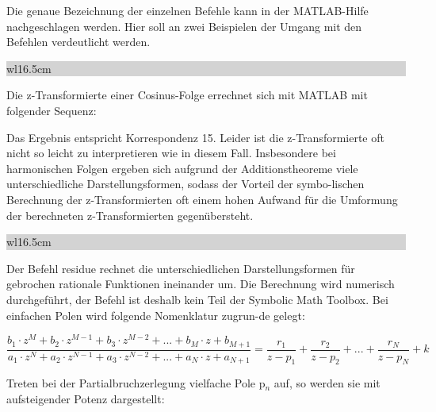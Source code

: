 \noindent Die genaue Bezeichnung der einzelnen Befehle kann in der MATLAB-Hilfe nachgeschlagen werden. Hier soll an zwei Beispielen der Umgang mit den Befehlen verdeutlicht werden. \bigskip

\noindent
\colorbox{lightgray}{%
%
\renewcommand\arraystretch{0.6}%
\begin{tabular}{ wl{16.5cm} }
{\selectfont{Beispiel: z-Transformation einer harmonischen Folge mit MATLAB}}
\end{tabular}%
}\medskip

\noindent Die z-Transformierte einer Cosinus-Folge errechnet sich mit MATLAB mit folgender Sequenz:



\noindent Das Ergebnis entspricht Korrespondenz 15. Leider ist die z-Transformierte oft nicht so leicht zu interpretieren wie in diesem Fall. Insbesondere bei harmonischen Folgen ergeben sich aufgrund der Additionstheoreme viele unterschiedliche Darstellungsformen, sodass der Vorteil der symbo-lischen Berechnung der z-Transformierten oft einem hohen Aufwand für die Umformung der berechneten 
z-Transformierten gegenübersteht.

\clearpage

\noindent
\colorbox{lightgray}{%
%
\renewcommand\arraystretch{0.6}%
\begin{tabular}{ wl{16.5cm} }
{\selectfont{Beispiel: Partialbruchzerlegung mit MATLAB}}
\end{tabular}%
}\medskip

\noindent Der Befehl residue rechnet die unterschiedlichen Darstellungsformen für gebrochen rationale Funktionen ineinander um. Die Berechnung wird numerisch durchgeführt, der Befehl ist deshalb kein Teil der Symbolic Math Toolbox. Bei einfachen Polen wird folgende Nomenklatur zugrun-de gelegt:

\begin{equation}\label{eq:fiveonehundredtwentyseven}
\frac{b_{1} \cdot z^{M} +b_{2} \cdot z^{M-1} +b_{3} \cdot z^{M-2} +...+b_{M} \cdot z+b_{M+1} }{a_{1} \cdot z^{N} +a_{2} \cdot z^{N-1} +a_{3} \cdot z^{N-2} +...+a_{N} \cdot z+a_{N+1} } =\frac{r_{1} }{z-p_{1} } +\frac{r_{2} }{z-p_{2} } +...+\frac{r_{N} }{z-p_{N} } +k
\end{equation}

\noindent Treten bei der Partialbruchzerlegung vielfache Pole p${}_{n}$ auf, so werden sie mit aufsteigender Potenz dargestellt:

